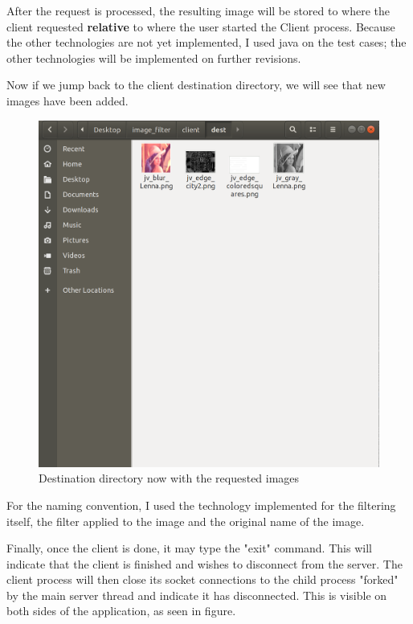 \documentclass[a4paper,12pt]{article}
\begin{document}
	After the request is processed, the resulting image will be stored to where the client requested \textbf{relative} to where the user started the Client process. Because the other technologies are not yet implemented, I used java on the test cases; the other technologies will be implemented on further revisions. 
	
	Now if we jump back to the client destination directory, we will see that new images have been added.
	
	\begin{figure}[H]
		\centering
		\includegraphics[width=\textwidth]{destfilled.png}
		\caption{Destination directory now with the requested images}
	\end{figure}	
	
	For the naming convention, I used the technology implemented for the filtering itself, the filter applied to the image and the original name of the image.
	
	Finally, once the client is done, it may type the "exit" command. This will indicate that the client is finished and wishes to disconnect from the server. The client process will then close its socket connections to the child process "forked" by the main server thread and indicate it has disconnected. This is visible on both sides of the application, as seen in figure.
	
\end{document}
